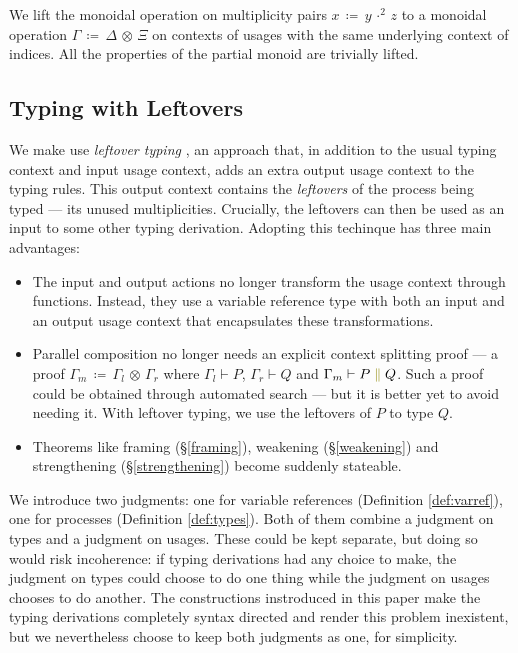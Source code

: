 \documentclass[a4paper,UKenglish,cleveref, autoref, thm-restate,authorcolumns]{lipics-v2019}
\theoremstyle{definition}
\newcommand{\constr}[1]{\textcolor{olive}{\operatorname{#1}}}
\newcommand{\comp}[2]{#1 \; \constr{\parallel} \; #2}
\newcommand{\opsquared}[3]{#1 \, \coloneqq \, #2 \, \cdot^2 \, #3}
\newcommand{\opctx}[3]{#1 \, \coloneqq \, #2 \, \otimes \, #3}
\begin{document}
\begin{note}
  We lift the monoidal operation on multiplicity pairs $\opsquared{x}{y}{z}$ to a monoidal operation $\opctx{\Gamma}{\Delta}{\Xi}$ on contexts of usages with the same underlying context of indices.
  All the properties of the partial monoid are trivially lifted.
\end{note}

\subsection{Typing with Leftovers}
\label{leftover-typing}

We make use \emph{leftover typing} \cite{}, an approach that, in addition to the usual typing context and input usage context, adds an extra output usage context to the typing rules.
This output context contains the \emph{leftovers} of the process being typed --- its unused multiplicities.
Crucially, the leftovers can then be used as an input to some other typing derivation.
Adopting this techinque has three main advantages:
\begin{itemize}
  \item
    The input and output actions no longer transform the usage context through functions.
    Instead, they use a variable reference type with both an input and an output usage context that encapsulates these transformations.
  \item
    Parallel composition no longer needs an explicit context splitting proof --- a proof $\opctx{\Gamma_m}{\Gamma_l}{\Gamma_r}$ where $\Gamma_l \vdash P$, $\Gamma_r \vdash Q$ and $\Gamma_m \vdash \comp{P}{Q}$.
    Such a proof could be obtained through automated search --- but it is better yet to avoid needing it.
    With leftover typing, we use the leftovers of $P$ to type $Q$.
  \item
    Theorems like framing (\S \ref{framing}), weakening (\S \ref{weakening}) and strengthening (\S \ref{strengthening}) become suddenly stateable.
\end{itemize}
  
We introduce two judgments: one for variable references (Definition \ref{def:varref}), one for processes (Definition \ref{def:types}).
Both of them combine a judgment on types and a judgment on usages.
These could be kept separate, but doing so would risk incoherence: if typing derivations had any choice to make, the judgment on types could choose to do one thing while the judgment on usages chooses to do another.
The constructions instroduced in this paper make the typing derivations completely syntax directed and render this problem inexistent, but we nevertheless choose to keep both judgments as one, for simplicity.
\end{document}
